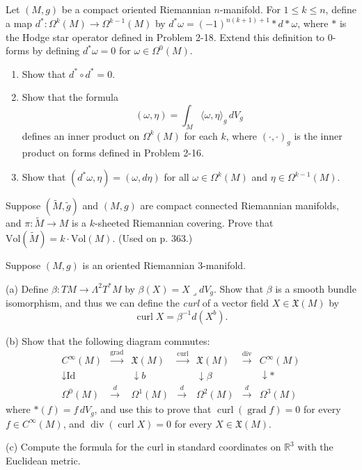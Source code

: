 \begin{exercise}
\label{prob:codifferential-operator}
Let $(M,g)$ be a compact oriented Riemannian $n$-manifold. For $1 \leq k \leq n$, define a map $d^* : \Omega^k(M) \to \Omega^{k-1}(M)$ by $d^* \omega = (-1)^{n(k+1)+1} * d * \omega$, where $*$ is the Hodge star operator defined in Problem 2-18. Extend this definition to 0-forms by defining $d^*\omega = 0$ for $\omega \in \Omega^0(M)$.

\begin{enumerate}
\item[(a)] Show that $d^* \circ d^* = 0$.
\item[(b)] Show that the formula
\[
(\omega, \eta) = \int_M \langle \omega, \eta \rangle_g \, dV_g
\]
defines an inner product on $\Omega^k(M)$ for each $k$, where $(\cdot, \cdot)_g$ is the inner product on forms defined in Problem 2-16.
\item[(c)] Show that $(d^*\omega, \eta) = (\omega, d\eta)$ for all $\omega \in \Omega^k(M)$ and $\eta \in \Omega^{k-1}(M)$.
\end{enumerate}
\end{exercise}

\begin{exercise}
\label{prob:covering-volume-form}
Suppose $(\tilde{M}, \tilde{g})$ and $(M, g)$ are compact connected Riemannian manifolds, and $\pi : \tilde{M} \to M$ is a $k$-sheeted Riemannian covering. Prove that $\text{Vol}(\tilde{M}) = k \cdot \text{Vol}(M)$. (Used on p. 363.)
\end{exercise}

\begin{exercise}
\label{prob:curl-vector-field}
Suppose $(M,g)$ is an oriented Riemannian 3-manifold.

(a) Define $\beta : TM \to \Lambda^2 T^* M$ by $\beta(X) = X \mathbin{\lrcorner} dV_g$. Show that $\beta$ is a smooth bundle isomorphism, and thus we can define the \emph{curl} of a vector field $X \in \mathfrak{X}(M)$ by
\[
\operatorname{curl} X = \beta^{-1} d(X^b).
\]

(b) Show that the following diagram commutes:
\[
\begin{array}{ccccccc}
C^{\infty}(M) & \xrightarrow{\operatorname{grad}} & \mathfrak{X}(M) & \xrightarrow{\operatorname{curl}} & \mathfrak{X}(M) & \xrightarrow{\operatorname{div}} & C^{\infty}(M) \\
\downarrow \text{Id} & & \downarrow b & & \downarrow \beta & & \downarrow * \\
\Omega^0(M) & \xrightarrow{d} & \Omega^1(M) & \xrightarrow{d} & \Omega^2(M) & \xrightarrow{d} & \Omega^3(M)
\end{array}
\]
where $*(f) = f \, dV_g$, and use this to prove that $\operatorname{curl}(\operatorname{grad} f) = 0$ for every $f \in C^{\infty}(M)$, and $\operatorname{div}(\operatorname{curl} X) = 0$ for every $X \in \mathfrak{X}(M)$.

(c) Compute the formula for the curl in standard coordinates on $\mathbb{R}^3$ with the Euclidean metric.
\end{exercise}

